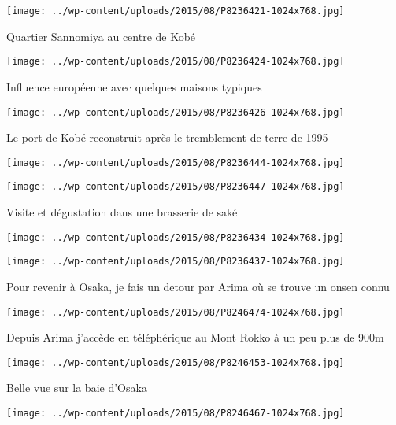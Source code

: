  \newline
\centerline{\texttt{[image: ../wp-content/uploads/2015/08/P8236421-1024x768.jpg]} } 
 \newline
 Quartier Sannomiya au centre de Kobé \newline
 \newline
\centerline{\texttt{[image: ../wp-content/uploads/2015/08/P8236424-1024x768.jpg]} } 
 \newline
 Influence européenne avec quelques maisons typiques \newline
 \newline
\centerline{\texttt{[image: ../wp-content/uploads/2015/08/P8236426-1024x768.jpg]} } 
 \newline
 Le port de Kobé reconstruit après le tremblement de terre de 1995 \newline
 \newline
\centerline{\texttt{[image: ../wp-content/uploads/2015/08/P8236444-1024x768.jpg]} } 
 \newline
 \newline
\centerline{\texttt{[image: ../wp-content/uploads/2015/08/P8236447-1024x768.jpg]} } 
 \newline
 Visite et dégustation dans une brasserie de saké \newline
 \newline
\centerline{\texttt{[image: ../wp-content/uploads/2015/08/P8236434-1024x768.jpg]} } 
 \newline
 \newline
\centerline{\texttt{[image: ../wp-content/uploads/2015/08/P8236437-1024x768.jpg]} } 
 \newline
 Pour revenir à Osaka, je fais un detour par Arima où se trouve un onsen connu \newline
 \newline
\centerline{\texttt{[image: ../wp-content/uploads/2015/08/P8246474-1024x768.jpg]} } 
 \newline
 Depuis Arima j'accède en téléphérique au Mont Rokko à un peu plus de 900m \newline
 \newline
\centerline{\texttt{[image: ../wp-content/uploads/2015/08/P8246453-1024x768.jpg]} } 
 \newline
 Belle vue sur la baie d'Osaka \newline
 \newline
\centerline{\texttt{[image: ../wp-content/uploads/2015/08/P8246467-1024x768.jpg]} } 

